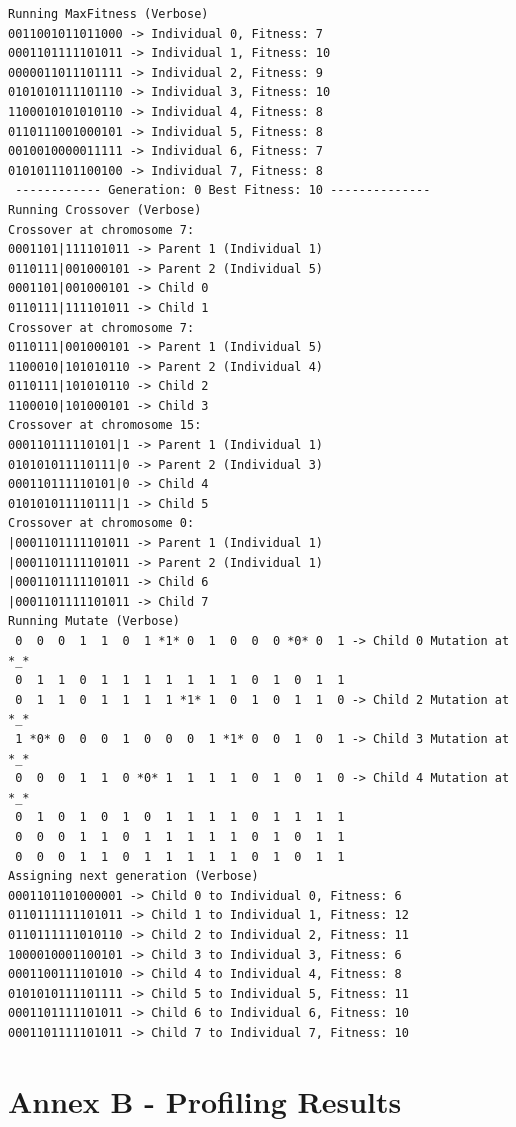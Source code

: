 \documentclass{article}
\begin{document}
\begin{lstlisting}
Running MaxFitness (Verbose)
0011001011011000 -> Individual 0, Fitness: 7
0001101111101011 -> Individual 1, Fitness: 10
0000011011101111 -> Individual 2, Fitness: 9
0101010111101110 -> Individual 3, Fitness: 10
1100010101010110 -> Individual 4, Fitness: 8
0110111001000101 -> Individual 5, Fitness: 8
0010010000011111 -> Individual 6, Fitness: 7
0101011101100100 -> Individual 7, Fitness: 8
 ------------ Generation: 0 Best Fitness: 10 --------------
Running Crossover (Verbose)
Crossover at chromosome 7:
0001101|111101011 -> Parent 1 (Individual 1)
0110111|001000101 -> Parent 2 (Individual 5)
0001101|001000101 -> Child 0
0110111|111101011 -> Child 1
Crossover at chromosome 7:
0110111|001000101 -> Parent 1 (Individual 5)
1100010|101010110 -> Parent 2 (Individual 4)
0110111|101010110 -> Child 2
1100010|101000101 -> Child 3
Crossover at chromosome 15:
000110111110101|1 -> Parent 1 (Individual 1)
010101011110111|0 -> Parent 2 (Individual 3)
000110111110101|0 -> Child 4
010101011110111|1 -> Child 5
Crossover at chromosome 0:
|0001101111101011 -> Parent 1 (Individual 1)
|0001101111101011 -> Parent 2 (Individual 1)
|0001101111101011 -> Child 6
|0001101111101011 -> Child 7
Running Mutate (Verbose)
 0  0  0  1  1  0  1 *1* 0  1  0  0  0 *0* 0  1 -> Child 0 Mutation at *_* 
 0  1  1  0  1  1  1  1  1  1  1  0  1  0  1  1 
 0  1  1  0  1  1  1  1 *1* 1  0  1  0  1  1  0 -> Child 2 Mutation at *_* 
 1 *0* 0  0  0  1  0  0  0  1 *1* 0  0  1  0  1 -> Child 3 Mutation at *_* 
 0  0  0  1  1  0 *0* 1  1  1  1  0  1  0  1  0 -> Child 4 Mutation at *_* 
 0  1  0  1  0  1  0  1  1  1  1  0  1  1  1  1 
 0  0  0  1  1  0  1  1  1  1  1  0  1  0  1  1 
 0  0  0  1  1  0  1  1  1  1  1  0  1  0  1  1 
Assigning next generation (Verbose)
0001101101000001 -> Child 0 to Individual 0, Fitness: 6
0110111111101011 -> Child 1 to Individual 1, Fitness: 12
0110111111010110 -> Child 2 to Individual 2, Fitness: 11
1000010001100101 -> Child 3 to Individual 3, Fitness: 6
0001100111101010 -> Child 4 to Individual 4, Fitness: 8
0101010111101111 -> Child 5 to Individual 5, Fitness: 11
0001101111101011 -> Child 6 to Individual 6, Fitness: 10
0001101111101011 -> Child 7 to Individual 7, Fitness: 10
\end{lstlisting}


\section*{Annex B - Profiling Results}
\end{document}
